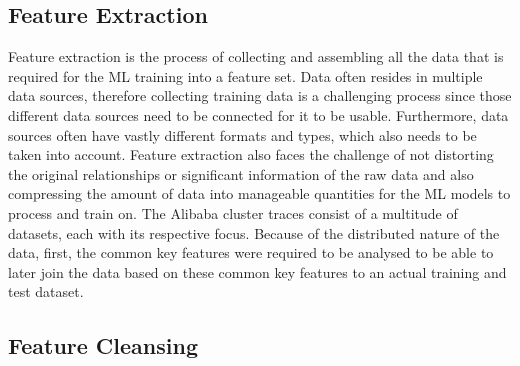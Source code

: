   \subsection{Feature Extraction}
  \label{sec:feature-extraction-preprocessing-architecture}

    Feature extraction is the process of collecting and assembling all the data that is required for the ML training into a feature set.
    Data often resides in multiple data sources, therefore collecting training data is a challenging process since those different data sources need to be connected for it to be usable. Furthermore, data sources often have vastly different formats and types, which also needs to be taken into account. 
    Feature extraction also faces the challenge of not distorting the original relationships or significant information of the raw data and also compressing the amount of data into manageable quantities for the ML models to process and train on.
    The Alibaba cluster traces consist of a multitude of datasets, each with its respective focus. Because of the distributed nature of the data, first, the common key features were required to be analysed to be able to later join the data based on these common key features to an actual training and test dataset.

  \subsection{Feature Cleansing}
  \label{sec:feature-cleansing-preprocessing-architecture}

